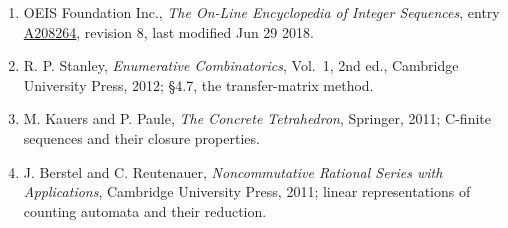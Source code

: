 \documentclass[11pt]{article}
\theoremstyle{definition}
\begin{document}
\begin{enumerate}

\item OEIS Foundation Inc., \emph{The On-Line Encyclopedia of Integer Sequences}, entry \href{https://oeis.org/A208264}{A208264}, revision 8, last modified Jun 29 2018.

\item R. P. Stanley, \emph{Enumerative Combinatorics}, Vol.~1, 2nd ed., Cambridge University Press, 2012; \S4.7, the transfer-matrix method.

\item M. Kauers and P. Paule, \emph{The Concrete Tetrahedron}, Springer, 2011; C-finite sequences and their closure properties.

\item J. Berstel and C. Reutenauer, \emph{Noncommutative Rational Series with Applications}, Cambridge University Press, 2011; linear representations of counting automata and their reduction.

\end{enumerate}
\end{document}
